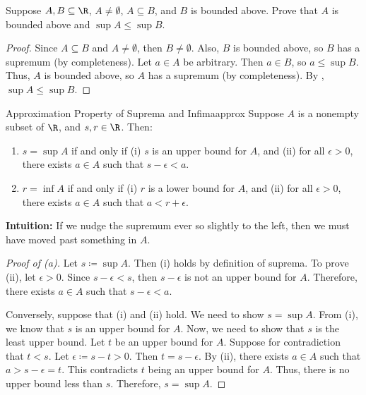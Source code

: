 \begin{exbox}{}{}
    Suppose $A,B \subseteq \R$, $A \neq \emptyset$, $A \subseteq B$, and $B$ is bounded above. Prove that $A$ is bounded above and $\sup A \leq \sup B$.
    \tcblower
    \begin{proof}
        Since $A \subseteq B$ and $A \neq \emptyset$, then $B \neq \emptyset$. Also, $B$ is bounded above, so $B$ has a supremum (by completeness). Let $a \in A$ be arbitrary. Then $a \in B$, so $a \leq \sup B$. Thus, $A$ is bounded above, so $A$ has a supremum (by completeness). By , $\sup A \leq \sup B$.
    \end{proof}
\end{exbox}

\begin{thmbox}{Approximation Property of Suprema and Infima}{approx}
    Suppose $A$ is a nonempty subset of $\R$, and $s,r \in \R$. Then:
    \begin{enumerate}[label=(\alph*)]
        \item $s = \sup A$ if and only if (i) $s$ is an upper bound for $A$, and (ii) for all $\epsilon > 0$, there exists $a \in A$ such that $s - \epsilon < a$.
        \item $r = \inf A$ if and only if (i) $r$ is a lower bound for $A$, and (ii) for all $\epsilon > 0$, there exists $a \in A$ such that $a < r + \epsilon$.
    \end{enumerate}
    \tcblower
    \textbf{Intuition:} If we nudge the supremum ever so slightly to the left, then we must have moved past something in $A$.
    \begin{proof}[Proof of (a)]
        Let $s \coloneq \sup A$. Then (i) holds by definition of suprema. To prove (ii), let $\epsilon > 0$. Since $s - \epsilon < s$, then $s - \epsilon$ is not an upper bound for $A$. Therefore, there exists $a \in A$ such that $s - \epsilon < a$.

        Conversely, suppose that (i) and (ii) hold. We need to show $s = \sup A$. From (i), we know that $s$ is an upper bound for $A$. Now, we need to show that $s$ is the least upper bound. Let $t$ be an upper bound for $A$. Suppose for contradiction that $t < s$. Let $\epsilon \coloneq s - t > 0$. Then $t = s - \epsilon$. By (ii), there exists $a \in A$ such that $a > s - \epsilon = t$. This contradicts $t$ being an upper bound for $A$. Thus, there is no upper bound less than $s$. Therefore, $s = \sup A$.
    \end{proof}
\end{thmbox}
